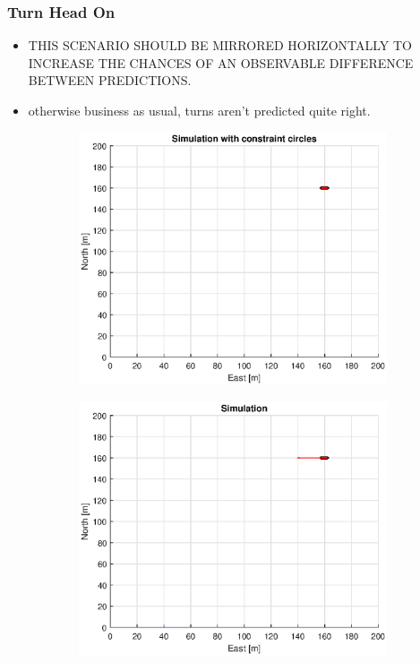 \subsubsection{Turn Head On}
\begin{itemize}
    \item THIS SCENARIO SHOULD BE MIRRORED HORIZONTALLY TO INCREASE THE CHANCES OF AN OBSERVABLE DIFFERENCE BETWEEN PREDICTIONS.
    \item otherwise business as usual, turns aren't predicted quite right.
\end{itemize}
\clearpage
\begin{figure}[!b] %
    \begin{subfigure}[b]{0.49\textwidth}
        \centering
        \includegraphics[width=\textwidth]{Images/Figures/sving_HO/Simple0_f1_Frame1}
    \end{subfigure}
    \hfill
    \begin{subfigure}[b]{0.499\textwidth}
        \centering
        \includegraphics[width=\textwidth]{Images/Figures/sving_HO/Simple0_f600_Frame1}

\end{subfigure}
\end{figure}
